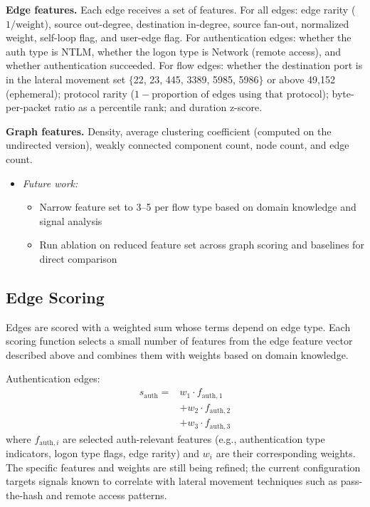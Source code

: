 \documentclass[letterpaper,twocolumn,10pt]{article}
\begin{document}
\textbf{Edge features.}
Each edge receives a set of features. For all edges: edge rarity ($1 / \text{weight}$), source out-degree, destination in-degree, source fan-out, normalized weight, self-loop flag, and user-edge flag. For authentication edges: whether the auth type is NTLM, whether the logon type is Network (remote access), and whether authentication succeeded. For flow edges: whether the destination port is in the lateral movement set $\{$22, 23, 445, 3389, 5985, 5986$\}$ or above 49,152 (ephemeral); protocol rarity ($1 - \text{proportion of edges using that protocol}$); byte-per-packet ratio as a percentile rank; and duration z-score.

\textbf{Graph features.}
Density, average clustering coefficient (computed on the undirected version), weakly connected component count, node count, and edge count.

\begin{itemize}
\item \textit{Future work:}
\begin{itemize}
\item Narrow feature set to 3--5 per flow type based on domain knowledge and signal analysis
\item Run ablation on reduced feature set across graph scoring and baselines for direct comparison
\end{itemize}
\end{itemize}

\subsection{Edge Scoring}

Edges are scored with a weighted sum whose terms depend on edge type. Each scoring function selects a small number of features from the edge feature vector described above and combines them with weights based on domain knowledge.

Authentication edges:
\begin{equation}
\begin{aligned}
s_{\text{auth}} ={}& w_1 \cdot f_{\text{auth},1} \\
                   &+ w_2 \cdot f_{\text{auth},2} \\
                   &+ w_3 \cdot f_{\text{auth},3}
\end{aligned}
\end{equation}
where $f_{\text{auth},i}$ are selected auth-relevant features (e.g., authentication type indicators, logon type flags, edge rarity) and $w_i$ are their corresponding weights. The specific features and weights are still being refined; the current configuration targets signals known to correlate with lateral movement techniques such as pass-the-hash and remote access patterns.
\end{document}
